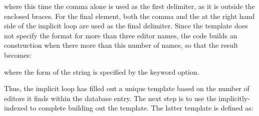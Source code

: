 \documentclass[letterpaper,10pt,english]{sphinxmanual}
\begin{document}
where this time the comma alone is used as the first delimiter, as it is outside the enclosed braces. For the final element, both the comma and the  at the right hand side of the implicit loop are used as the final delimiter. Since the template does not specify the format for more than three editor names, the code builds an  construction when there more than this number of names, so that the result becomes:

%
\begin{sphinxVerbatim}[commandchars=\\\{\}]
   \PYGZbs{} 
\end{sphinxVerbatim}

where the form of the string  is specified by the  keyword option.

Thus, the implicit loop has filled out a unique template based on the number of editors it finds within the database entry. The next step is to use the implicitly-indexed  to complete building out the template. The latter template is defined as:

%
\begin{sphinxVerbatim}[commandchars=\\\{\}]
  \PYG{p}{[} \PYG{p}{]}\PYG{p}{[} \PYG{p}{]}
               \PYG{p}{[} \PYG{p}{]}\PYG{p}{[} \PYG{p}{]}
\end{sphinxVerbatim}
\end{document}
